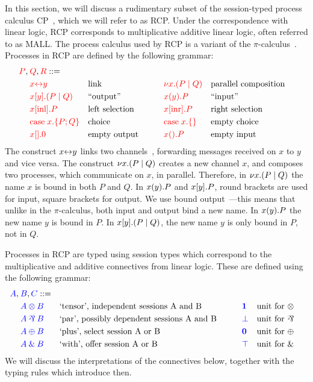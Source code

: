 \documentclass[a4paper,UKenglish]{lipics-v2016}
\begin{document}
In this section, we will discuss a rudimentary subset of the session-typed
process calculus CP~\cite{wadler2012}, which we will refer to as RCP.
Under the correspondence with linear logic, RCP corresponds to multiplicative
additive linear logic, often referred to as MALL.
The process calculus used by RCP is a variant of the
$\pi$-calculus~\cite{milner1992b}. Processes in RCP are defined by
the following grammar:
\[
  \begin{aligned}
    \red{P},\:&\red{Q},\red{R} ::=\\
    &       \red{\link{x}{y}}           &&\text{link}
    &\qquad&\red{\cut{x}(P \mid Q)}     &&\text{parallel composition}\\
    &       \red{\send{x}{y}(P \mid Q)} &&\text{``output''}
    &\qquad&\red{\recv{x}{y}P}          &&\text{``input''}\\
    &       \red{\inl{x}P}              &&\text{left selection}
    &\qquad&\red{\inr{x}P}              &&\text{right selection}\\
    &       \red{\case{x}{P}{Q}}        &&\text{choice}
    &\qquad&\red{\case{x}{}{}}          &&\text{empty choice}\\
    &       \red{\send{x}{}0}           &&\text{empty output}
    &\qquad&\red{\recv{x}{}P}           &&\text{empty input}\\
  \end{aligned}
\]
The construct ${x{\leftrightarrow}y}$ links two channels~\cite{sangiorgi1996,boreale1998},
forwarding messages received on $x$ to $y$ and vice versa.
%
The construct ${\nu x.}{(P \mid Q)}$ creates a new channel $x$, and composes two
processes, which communicate on $x$, in parallel.
Therefore, in ${\nu x.}{(P \mid Q)}$ the name $x$ is bound in both $P$ and $Q$.
%
In ${x(y).}P$ and ${x[y].}P$, round brackets are used for input, square
brackets for output.
We use bound output~\cite{sangiorgi1996}---this means that unlike in the
$\pi$-calculus, both input and output bind a new name.
In ${x(y).}P$ the new name $y$ is bound in $P$.
In ${x[y].}{(P \mid Q)}$, the new name $y$ is only bound in $P$, not in $Q$.

Processes in RCP are typed using session types which correspond to the
multiplicative and additive connectives from linear logic. These are defined
using the following grammar:
\[
  \begin{aligned}
    \blue{A},\:&\blue{B},\blue{C} ::=\\
    &       \tm{A \tens B} &&\text{`tensor', independent sessions A and B}
    &\qquad&\tm{\one}      &&\text{unit for \tens}\\
    &       \tm{A \parr B} &&\text{`par', possibly dependent sessions A and B}
    &\qquad&\tm{\bot}      &&\text{unit for \parr}\\
    &       \tm{A \plus B} &&\text{`plus', select session A or B}
    &\qquad&\tm{\nil}      &&\text{unit for \plus}\\
    &       \tm{A \with B} &&\text{`with', offer session A or B}
    &\qquad&\tm{\top}      &&\text{unit for \with}
  \end{aligned}
\]
We will discuss the interpretations of the connectives below, together with the
typing rules which introduce then.
\end{document}
